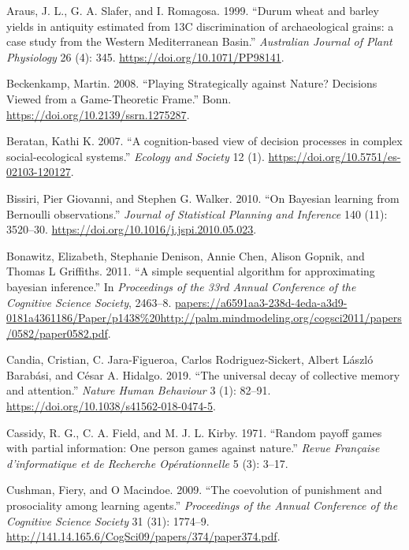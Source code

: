 \documentclass[smallextended]{svjour3}       %
\begin{document}
\leavevmode\hypertarget{ref-Slafer1999}{}%
Araus, J. L., G. A. Slafer, and I. Romagosa. 1999. ``Durum wheat and barley yields in antiquity estimated from 13C discrimination of archaeological grains: a case study from the Western Mediterranean Basin.'' \emph{Australian Journal of Plant Physiology} 26 (4): 345. \url{https://doi.org/10.1071/PP98141}.

\leavevmode\hypertarget{ref-Beckenkamp2008}{}%
Beckenkamp, Martin. 2008. ``Playing Strategically against Nature? Decisions Viewed from a Game-Theoretic Frame.'' Bonn. \url{https://doi.org/10.2139/ssrn.1275287}.

\leavevmode\hypertarget{ref-Beratan2007}{}%
Beratan, Kathi K. 2007. ``A cognition-based view of decision processes in complex social-ecological systems.'' \emph{Ecology and Society} 12 (1). \url{https://doi.org/10.5751/es-02103-120127}.

\leavevmode\hypertarget{ref-Bissiri2010}{}%
Bissiri, Pier Giovanni, and Stephen G. Walker. 2010. ``On Bayesian learning from Bernoulli observations.'' \emph{Journal of Statistical Planning and Inference} 140 (11): 3520--30. \url{https://doi.org/10.1016/j.jspi.2010.05.023}.

\leavevmode\hypertarget{ref-Bonawitz2011}{}%
Bonawitz, Elizabeth, Stephanie Denison, Annie Chen, Alison Gopnik, and Thomas L Griffiths. 2011. ``A simple sequential algorithm for approximating bayesian inference.'' In \emph{Proceedings of the 33rd Annual Conference of the Cognitive Science Society}, 2463--8. \url{papers://a6591aa3-238d-4eda-a3d9-0181a4361186/Paper/p1438\%20http://palm.mindmodeling.org/cogsci2011/papers/0582/paper0582.pdf}.

\leavevmode\hypertarget{ref-Candia2019}{}%
Candia, Cristian, C. Jara-Figueroa, Carlos Rodriguez-Sickert, Albert László Barabási, and César A. Hidalgo. 2019. ``The universal decay of collective memory and attention.'' \emph{Nature Human Behaviour} 3 (1): 82--91. \url{https://doi.org/10.1038/s41562-018-0474-5}.

\leavevmode\hypertarget{ref-Cassidy1971}{}%
Cassidy, R. G., C. A. Field, and M. J. L. Kirby. 1971. ``Random payoff games with partial information: One person games against nature.'' \emph{Revue Française d'informatique et de Recherche Opérationnelle} 5 (3): 3--17.

\leavevmode\hypertarget{ref-Cushman2009}{}%
Cushman, Fiery, and O Macindoe. 2009. ``The coevolution of punishment and prosociality among learning agents.'' \emph{Proceedings of the Annual Conference of the Cognitive Science Society} 31 (31): 1774--9. \url{http://141.14.165.6/CogSci09/papers/374/paper374.pdf}.
\end{document}
